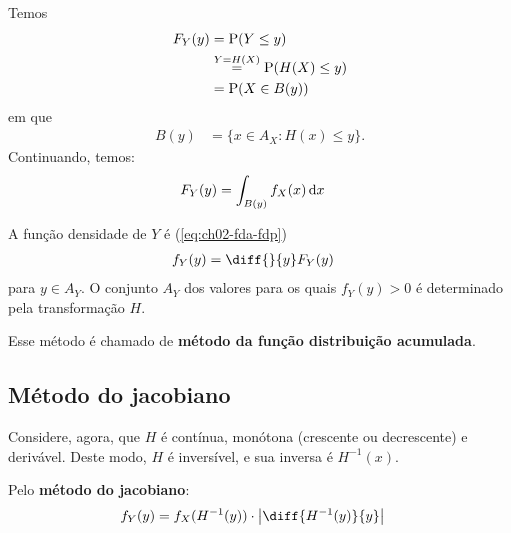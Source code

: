 Temos
\begin{align}
    F_Y(y) &= \operatorname{P}(Y \le y) \notag \\
    &\overset{Y = H(X)}{=} \operatorname{P}(H(X) \le y) \notag \\
    &= \operatorname{P}(X \in B(y)) \label{eq:ch04-metodo-fda}
\end{align}
em que
\begin{align}
    B(y) &= \{
        x \in A_X: H(x) \le y
    \}. \label{eq:ch04-metodo-fda-dom}
\end{align}
Continuando, temos:
\begin{align*}
    F_Y(y) &= \int_{B(y)} f_X(x) \,\mathrm{d} x
\end{align*}

A função densidade de $Y$ é (\cref{eq:ch02-fda-fdp})
\begin{align*}
    f_Y(y) &= \diff{}{y} F_Y(y)
\end{align*}
para $y \in A_Y$. O conjunto $A_Y$ dos valores para os quais $f_Y(y) > 0$ é determinado pela transformação $H$.

Esse método é chamado de \textbf{método da função distribuição acumulada}.

\subsection{Método do jacobiano}

Considere, agora, que $H$ é contínua, monótona (crescente ou decrescente) e derivável. Deste modo, $H$ é inversível,
e sua inversa é $H^{-1}(x)$.

Pelo \textbf{método do jacobiano}:
\begin{align}
    f_Y(y) &= f_X(H^{-1}(y)) \cdot \left|\diff{H^{-1}(y)}{y}\right|
    \label{eq:ch04-metodo-jac}
\end{align}

